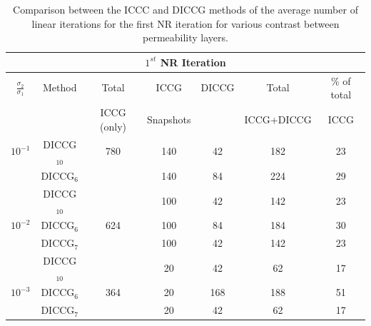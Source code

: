 \documentclass[12pt]{article}
\begin{document}
\begin{table}[!ht]\centering
\begin{minipage}{1\textwidth}
\vspace{-10pt}
\centering
\begin{tabular}{ |c|c|c|c|c|c|c|} 

\hline
\multicolumn{7}{|c|}{$1^{st}$ NR Iteration}  \\
\hline
$\frac{\sigma_2}{\sigma_1}$&Method& Total & ICCG&DICCG &Total&\% of total\\
                           &      & ICCG (only) & Snapshots& &ICCG+DICCG& ICCG\\
\hline
$10^{-1}$ &DICCG$_{10}$&780 & 140&42& 182&23\\
 &DICCG$_6$& &140&84&  224&29\\
 \hline
 &DICCG$_{10}$& &100&42&  142&23\\
$10^{-2}$ &DICCG$_6$& 624&100&84&  184&30\\
          &DICCG$_7$&&100&42& 142 &23\\
          \hline
          &DICCG$_{10}$& &20&42  &62& 17\\
$10^{-3}$ &DICCG$_6$&364 &20&168&  188& 51\\
          &DICCG$_7$&&20&42&  62&17 \\
 \hline
 \end{tabular}
\caption{Comparison between the ICCC and DICCG methods of the average number of linear iterations for the first NR iteration for various contrast between permeability layers. }\label{table:litertot1}
\end{minipage}
\end{table}
\end{document}
